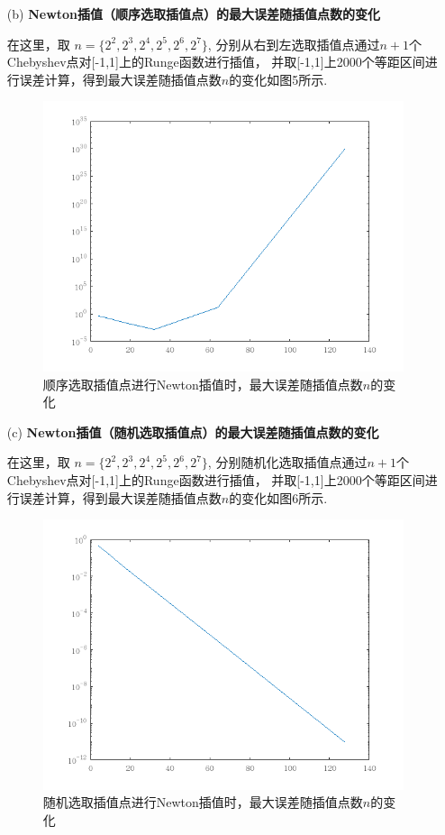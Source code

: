 \documentclass[12pt,a4paper,utf8]{ctexart}
\begin{document}
\begin{enumerate}
\begin{itemize}
  \item [(b)] \textbf{Newton插值（顺序选取插值点）的最大误差随插值点数的变化}
  \par 
  在这里，取 $ n = \{ 2^2, 2^3, 2^4, 2^5, 2^6, 2^7 \}$,
  分别从右到左选取插值点通过$n+1$个Chebyshev点对[-1,1]上的Runge函数进行插值，
  并取[-1,1]上2000个等距区间进行误差计算，得到最大误差随插值点数$n$的变化如图5所示.
  \begin{figure}[htbp]
    \centering
    \includegraphics[scale=0.7]{pictures/p2_2.png}
    \caption{\small{顺序选取插值点进行Newton插值时，最大误差随插值点数$n$的变化}} %
  \end{figure}

  \item [(c)] \textbf{Newton插值（随机选取插值点）的最大误差随插值点数的变化}
  \par 
  在这里，取 $ n = \{ 2^2, 2^3, 2^4, 2^5, 2^6, 2^7 \}$,
  分别随机化选取插值点通过$n+1$个Chebyshev点对[-1,1]上的Runge函数进行插值，
  并取[-1,1]上2000个等距区间进行误差计算，得到最大误差随插值点数$n$的变化如图6所示.
  \begin{figure}[htbp]
    \centering
    \includegraphics[scale=0.7]{pictures/p2_3.png}
    \caption{\small{随机选取插值点进行Newton插值时，最大误差随插值点数$n$的变化}} %
  \end{figure}


\end{itemize}
\end{enumerate}
\end{document}
